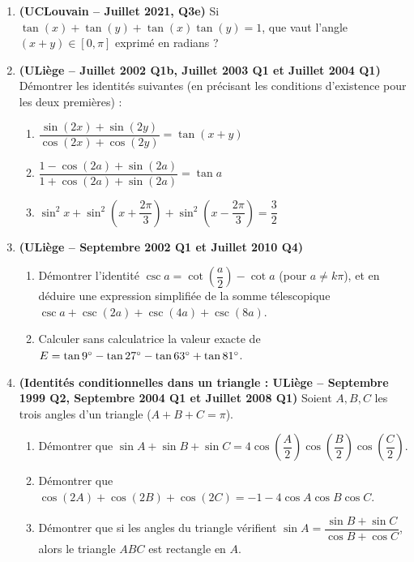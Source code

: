 \begin{enumerate}[label=\textbf{Exercice 2.\arabic* --}, align=left, leftmargin=*]
    \item \textbf{(UCLouvain -- Juillet 2021, Q3e)} Si $\tan(x) + \tan(y) + \tan(x)\tan(y) = 1$, que vaut l'angle $(x+y) \in [0, \pi]$ exprimé en radians ?

    \item \textbf{(ULiège -- Juillet 2002 Q1b, Juillet 2003 Q1 et Juillet 2004 Q1)} Démontrer les identités suivantes (en précisant les conditions d'existence pour les deux premières) :
    \begin{enumerate}
        \item $\dfrac{\sin(2x) + \sin(2y)}{\cos(2x) + \cos(2y)} = \tan(x+y)$
        \item $\dfrac{1 - \cos(2a) + \sin(2a)}{1 + \cos(2a) + \sin(2a)} = \tan a$
        \item $\sin^2 x + \sin^2\left(x + \dfrac{2\pi}{3}\right) + \sin^2\left(x - \dfrac{2\pi}{3}\right) = \dfrac{3}{2}$
    \end{enumerate}

    \item \textbf{(ULiège -- Septembre 2002 Q1 et Juillet 2010 Q4)}
    \begin{enumerate}
        \item Démontrer l'identité $\csc a = \cot\left(\dfrac{a}{2}\right) - \cot a$ (pour $a \neq k\pi$), et en déduire une expression simplifiée de la somme télescopique $\csc a + \csc(2a) + \csc(4a) + \csc(8a)$.
        \item Calculer sans calculatrice la valeur exacte de $E = \tan 9\degree - \tan 27\degree - \tan 63\degree + \tan 81\degree$.
    \end{enumerate}

    \item \textbf{(Identités conditionnelles dans un triangle : ULiège -- Septembre 1999 Q2, Septembre 2004 Q1 et Juillet 2008 Q1)} Soient $A, B, C$ les trois angles d'un triangle ($A+B+C = \pi$).
    \begin{enumerate}
        \item Démontrer que $\sin A + \sin B + \sin C = 4\cos\left(\dfrac{A}{2}\right)\cos\left(\dfrac{B}{2}\right)\cos\left(\dfrac{C}{2}\right)$.
        \item Démontrer que $\cos(2A) + \cos(2B) + \cos(2C) = -1 - 4\cos A \cos B \cos C$.
        \item Démontrer que si les angles du triangle vérifient $\sin A = \dfrac{\sin B + \sin C}{\cos B + \cos C}$, alors le triangle $ABC$ est rectangle en $A$.
    \end{enumerate}


\end{enumerate}
